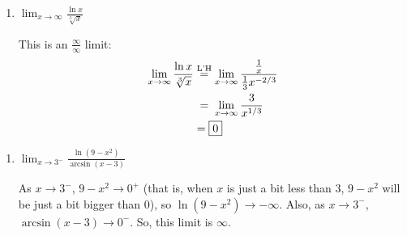 \documentclass[main]{subfiles}
\begin{document}
\begin{enumerate}
\begin{enumerate}
    \begin{solution}
      As $x \to 2$, $3x + 1 \to 7$ and $x - 1 \to 1$, so this limit is
      just equal to $\frac{7}{1} = \boxed{7}$.  (L'Hôpital's Rule does
      not apply, but we don't need it anyway!) 
    \end{solution}

  \item

    \begin{problem}[\vfill]
      $\displaystyle \lim_{x \to \infty} \frac{\ln x}{\sqrt[3]{x}}$
    \end{problem}

    \begin{solution}
      This is an $\frac{\infty}{\infty}$ limit:
      \begin{align*}
        \lim_{x \to \infty} \frac{\ln x}{\sqrt[3]{x}} & \lheq \lim_{x \to
          \infty} \frac{\frac{1}{x}}{\frac{1}{3} x^{-2/3}} \\
        & \nolheq \lim_{x \to \infty} \frac{3}{x^{1/3}} \\
        &= \boxed{0}
      \end{align*}
    \end{solution}
\end{enumerate}



\begin{enumerate}[start=5]

  \item


    \begin{problem}[\vfill]
      $\displaystyle \lim_{x \to 3^-} \frac{\ln (9 - x^2)}{\arcsin (x -
        3)}$
    \end{problem}

    \begin{solution}
      As $x \to 3^-$, $9 - x^2 \to 0^+$ (that is, when $x$ is just a bit
      less than $3$, $9 - x^2$ will be just a bit bigger than 0), so
      $\ln(9 - x^2) \to -\infty$.  Also, as $x \to 3^-$, $\arcsin(x - 3)
      \to 0^-$.  So, this limit is $\boxed{\infty}$. 
    \end{solution}


\end{enumerate}
\end{enumerate}
\end{document}
